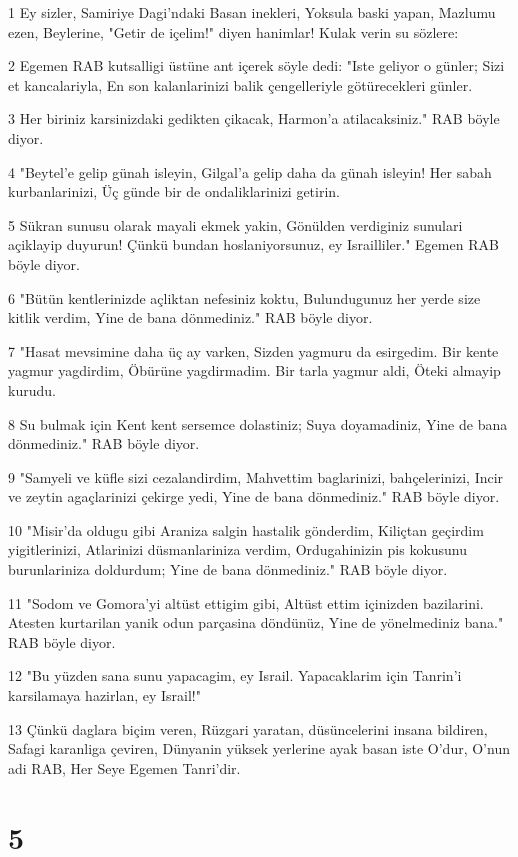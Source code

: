 \par 1 Ey sizler, Samiriye Dagi'ndaki Basan inekleri, Yoksula baski yapan, Mazlumu ezen, Beylerine, "Getir de içelim!" diyen hanimlar! Kulak verin su sözlere:
\par 2 Egemen RAB kutsalligi üstüne ant içerek söyle dedi: "Iste geliyor o günler; Sizi et kancalariyla, En son kalanlarinizi balik çengelleriyle götürecekleri günler.
\par 3 Her biriniz karsinizdaki gedikten çikacak, Harmon'a atilacaksiniz." RAB böyle diyor.
\par 4 "Beytel'e gelip günah isleyin, Gilgal'a gelip daha da günah isleyin! Her sabah kurbanlarinizi, Üç günde bir de ondaliklarinizi getirin.
\par 5 Sükran sunusu olarak mayali ekmek yakin, Gönülden verdiginiz sunulari açiklayip duyurun! Çünkü bundan hoslaniyorsunuz, ey Israilliler." Egemen RAB böyle diyor.
\par 6 "Bütün kentlerinizde açliktan nefesiniz koktu, Bulundugunuz her yerde size kitlik verdim, Yine de bana dönmediniz." RAB böyle diyor.
\par 7 "Hasat mevsimine daha üç ay varken, Sizden yagmuru da esirgedim. Bir kente yagmur yagdirdim, Öbürüne yagdirmadim. Bir tarla yagmur aldi, Öteki almayip kurudu.
\par 8 Su bulmak için Kent kent sersemce dolastiniz; Suya doyamadiniz, Yine de bana dönmediniz." RAB böyle diyor.
\par 9 "Samyeli ve küfle sizi cezalandirdim, Mahvettim baglarinizi, bahçelerinizi, Incir ve zeytin agaçlarinizi çekirge yedi, Yine de bana dönmediniz." RAB böyle diyor.
\par 10 "Misir'da oldugu gibi Araniza salgin hastalik gönderdim, Kiliçtan geçirdim yigitlerinizi, Atlarinizi düsmanlariniza verdim, Ordugahinizin pis kokusunu burunlariniza doldurdum; Yine de bana dönmediniz." RAB böyle diyor.
\par 11 "Sodom ve Gomora'yi altüst ettigim gibi, Altüst ettim içinizden bazilarini. Atesten kurtarilan yanik odun parçasina döndünüz, Yine de yönelmediniz bana." RAB böyle diyor.
\par 12 "Bu yüzden sana sunu yapacagim, ey Israil. Yapacaklarim için Tanrin'i karsilamaya hazirlan, ey Israil!"
\par 13 Çünkü daglara biçim veren, Rüzgari yaratan, düsüncelerini insana bildiren, Safagi karanliga çeviren, Dünyanin yüksek yerlerine ayak basan iste O'dur, O'nun adi RAB, Her Seye Egemen Tanri'dir.

\chapter{5}

